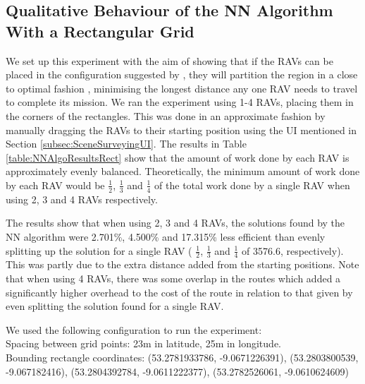 \pagebreak
\subsection{Qualitative Behaviour of the NN Algorithm With a Rectangular Grid}
We set up this experiment with the aim of showing that if the RAVs can be placed in the configuration suggested by \citeauthor{Hungerlander2018TheGrids}, they will partition the region in a close to optimal fashion \cite{Hungerlander2018TheGrids}, minimising the longest distance any one RAV needs to travel to complete its mission. We ran the experiment using 1-4 RAVs, placing them in the corners of the rectangles. This was done in an approximate fashion by manually dragging the RAVs to their starting position using the UI mentioned in Section \ref{subsec:SceneSurveyingUI}. The results in Table \ref{table:NNAlgoResultsRect} show that the amount of work done by each RAV is approximately evenly balanced. Theoretically, the minimum amount of work done by each RAV would be $\frac{1}{2}$, $\frac{1}{3}$ and $\frac{1}{4}$ of the total work done by a single RAV when using 2, 3 and 4 RAVs respectively.
\par The results show that when using 2, 3 and 4 RAVs, the solutions found by the NN algorithm were 2.701\%, 4.500\% and 17.315\% less efficient than evenly splitting up the solution for a single RAV ( $\frac{1}{2}$, $\frac{1}{3}$ and $\frac{1}{4}$ of 3576.6, respectively). This was partly due to the extra distance added from the starting positions. Note that when using 4 RAVs, there was some overlap in the routes which added a significantly higher overhead to the cost of the route in relation to that given by even splitting the solution found for a single RAV.


We used the following configuration to run the experiment:
\\Spacing between grid points: 23m in latitude, 25m in longitude.
\\Bounding rectangle coordinates: (53.2781933786, -9.0671226391), (53.2803800539, -9.067182416), (53.2804392784, -9.0611222377), (53.2782526061, -9.0610624609)
\\

